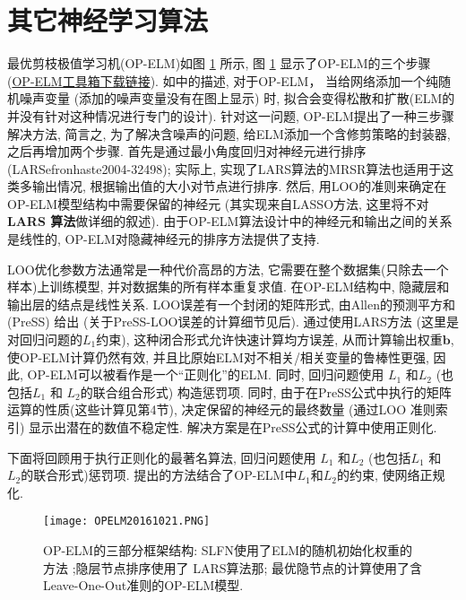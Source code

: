\section{其它神经学习算法}
最优剪枝极值学习机(OP-ELM)如图 \ref{OPELM20161021fig2} 所示, 图 \ref{OPELM20161021fig2} 显示了OP-ELM的三个步骤 (\href{http://www.cis.hut.fi/projects/eiml/research/download}{OP-ELM工具箱下载链接}).
如\cite{Miche2008OP, Miche2008A, Miche2010OP}中的描述, 对于OP-ELM， 当给网络添加一个纯随机噪声变量 (添加的噪声变量没有在图上显示) 时, 拟合会变得松散和扩散(ELM的并没有针对这种情况进行专门的设计).
针对这一问题, OP-ELM提出了一种三步骤解决方法, 简言之, 为了解决含噪声的问题, 给ELM添加一个含修剪策略的封装器, 之后再增加两个步骤.
首先是通过最小角度回归对神经元进行排序(LARS{efronhaste2004-32498});
实际上, 实现了LARS算法的MRSR算法\cite{SimiläTikka2005-32497}也适用于这类多输出情况, 根据输出值的大小对节点进行排序.
然后, 用LOO的准则来确定在OP-ELM模型结构中需要保留的神经元 (其实现来自LASSO方法, 这里将不对\textbf{LARS 算法}做详细的叙述).
由于OP-ELM算法设计中的神经元和输出之间的关系是线性的, OP-ELM对隐藏神经元的排序方法提供了支持.

LOO优化参数方法通常是一种代价高昂的方法, 它需要在整个数据集(只除去一个样本)上训练模型, 并对数据集的所有样本重复求值.
在OP-ELM结构中, 隐藏层和输出层的结点是线性关系.
LOO误差有一个封闭的矩阵形式, 由Allen的预测平方和 (PreSS) 给出 (关于PreSS-LOO误差的计算细节见后).
通过使用LARS方法 (这里是对回归问题的$L_1$约束), 这种闭合形式允许快速计算均方误差, 从而计算输出权重$\bm b$, 使OP-ELM计算仍然有效,
并且比原始ELM对不相关/相关变量的鲁棒性更强, 因此, OP-ELM可以被看作是一个“正则化”的ELM.
同时, 回归问题使用 $L_1$ 和$L_2$ (也包括$L_1$ 和 $L_2$的联合组合形式) 构造惩罚项.
同时, 由于在PreSS公式中执行的矩阵运算的性质(这些计算见第4节), 决定保留的神经元的最终数量 (通过LOO 准则索引) 显示出潜在的数值不稳定性.
解决方案是在PreSS公式的计算中使用正则化.

下面将回顾用于执行正则化的最著名算法, 回归问题使用 $L_1$ 和$L_2$ (也包括$L_1$ 和 $L_2$的联合形式)惩罚项.
提出的方法结合了OP-ELM中$L_1$和$L_2$的约束, 使网络正规化.
\begin{figure}[t]
    \begin{center}
    \texttt{[image: OPELM20161021.PNG]}
    \end{center}
    \caption{OP-ELM的三部分框架结构: SLFN使用了ELM的随机初始化权重的方法 ;隐层节点排序使用了 LARS算法那; 最优隐节点的计算使用了含Leave-One-Out准则的OP-ELM模型.}
    \label{OPELM20161021fig2}
\end{figure}

